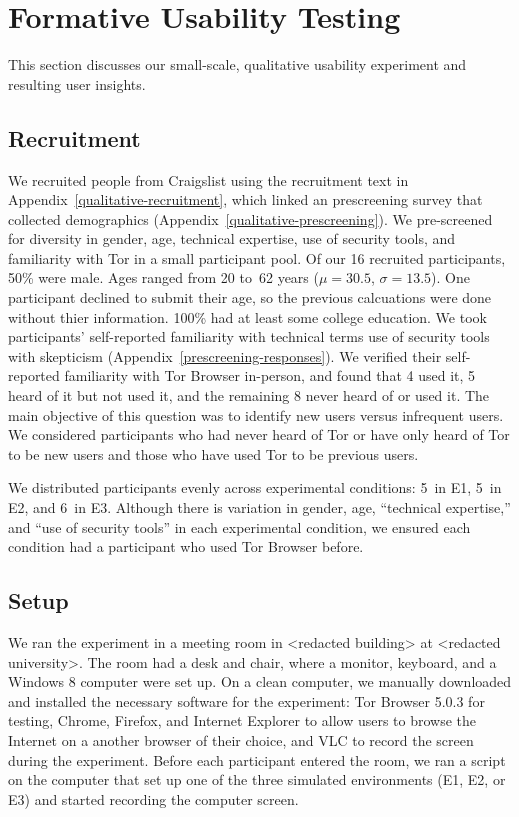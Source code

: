 \documentclass[USenglish,oneside,twocolumn]{article}
\begin{document}
\section{Formative Usability Testing}
\label{sec:qualitative}
This section discusses our small-scale, qualitative usability experiment and resulting user insights. 

\subsection{Recruitment}
We recruited people from Craigslist using the recruitment text in Appendix~\ref{qualitative-recruitment}, which linked an prescreening survey that collected demographics (Appendix~\ref{qualitative-prescreening}). We pre-screened~\cite{screening} for diversity in gender, age, technical expertise, use of security tools, and familiarity with Tor in a small participant pool. Of our 16 recruited participants, 50\% were male. Ages ranged from 20 to~62 years ($\mu = 30.5$, $\sigma = 13.5$). One participant declined to submit their age, so the previous calcuations were done without thier information. 100\% had at least some college education. We took participants' self-reported familiarity with technical terms use of security tools with skepticism (Appendix~\ref{prescreening-responses}). We verified their self-reported familiarity with Tor Browser in-person, and found that 4 used it, 5 heard of it but not used it, and the remaining 8 never heard of or used it. The main objective of this question was to identify new users versus infrequent users. We considered participants who had never heard of Tor or have only heard of Tor to be new users and those who have used Tor to be previous users. 



We distributed participants evenly across experimental conditions:  5~in E1, 5~in E2, and 6~in E3. Although there is variation in gender, age, ``technical expertise,'' and ``use of security tools'' in each experimental condition, we ensured each condition had a participant who used Tor Browser before. 

\subsection{Setup} 
We ran the experiment in a meeting room in <redacted building> at <redacted university>. The room had a desk and chair, where a monitor, keyboard, and a Windows 8 computer were set up. On a clean computer, we manually downloaded and installed the necessary software for the experiment: Tor Browser 5.0.3 for testing, Chrome, Firefox, and Internet Explorer to allow users to browse the Internet on a another browser of their choice, and VLC to record the screen during the experiment. Before each participant entered the room, we ran a script on the computer that
set up one of the three simulated environments (E1, E2, or E3) and started recording the computer screen.  
\end{document}
